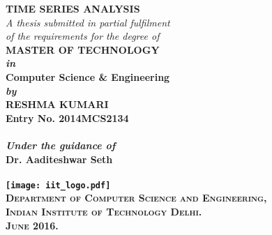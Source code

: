 \begin{titlepage}
\begin{center}

\LARGE{\textsf{\bfseries TIME SERIES ANALYSIS}}\\
\vspace{20pt}
\normalsize
\emph{A thesis submitted in partial fulfilment} \\
\emph{of the requirements for the degree of} \\
\vspace{20pt}
\bfseries MASTER OF TECHNOLOGY \\
\vspace{20pt}
\emph {in}\\
\vspace{20pt}
\bfseries Computer Science \& Engineering \\
\vspace{20pt}
\emph {by}\\
\vspace{20pt}
\Large{\textsf{\bfseries RESHMA KUMARI}} \\
{\normalsize \textsf{\bfseries Entry No. 2014MCS2134}}\\
\ \\
{\normalsize \emph {Under the guidance of}}
\ \\
\Large{\textsf{\bfseries Dr. Aaditeshwar Seth}} \\
\ \\
\vspace{30pt}
\texttt{[image: iit\_logo.pdf]} \\
\vspace{10pt}
\large{\textsc{Department of Computer Science and Engineering,\\
Indian Institute of Technology Delhi.\\ June 2016.}}
\end{center}
\end{titlepage}
